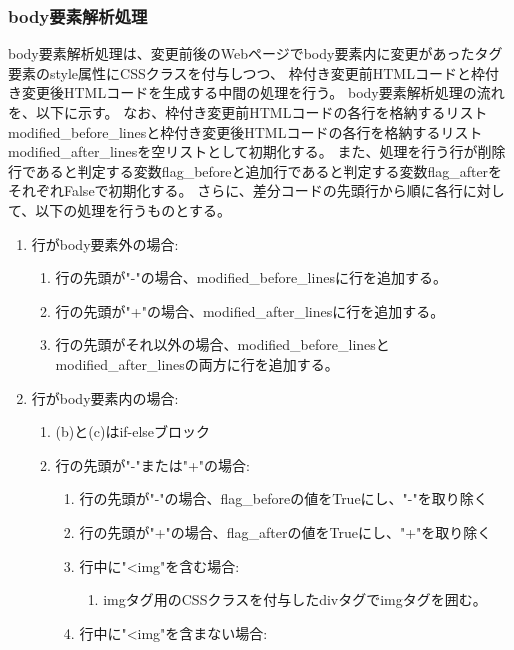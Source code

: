 \subsubsection{body要素解析処理}
body要素解析処理は、変更前後のWebページでbody要素内に変更があったタグ要素のstyle属性にCSSクラスを付与しつつ、
枠付き変更前HTMLコードと枠付き変更後HTMLコードを生成する中間の処理を行う。
body要素解析処理の流れを、以下に示す。
なお、枠付き変更前HTMLコードの各行を格納するリストmodified\_before\_linesと枠付き変更後HTMLコードの各行を格納するリストmodified\_after\_linesを空リストとして初期化する。
また、処理を行う行が削除行であると判定する変数flag\_beforeと追加行であると判定する変数flag\_afterをそれぞれFalseで初期化する。
さらに、差分コードの先頭行から順に各行に対して、以下の処理を行うものとする。
\begin{enumerate}
    \item 行がbody要素外の場合:
          \begin{enumerate}
              \item 行の先頭が"-"の場合、modified\_before\_linesに行を追加する。
              \item 行の先頭が"+"の場合、modified\_after\_linesに行を追加する。
              \item 行の先頭がそれ以外の場合、modified\_before\_linesとmodified\_after\_linesの両方に行を追加する。
          \end{enumerate}
    \item 行がbody要素内の場合:
          \begin{enumerate}
              \item (b)と(c)はif-elseブロック
              \item 行の先頭が"-"または"+"の場合:
                    \begin{enumerate}
                        \item 行の先頭が"-"の場合、flag\_beforeの値をTrueにし、"-"を取り除く
                        \item 行の先頭が"+"の場合、flag\_afterの値をTrueにし、"+"を取り除く
                        \item 行中に"\textless img"を含む場合:
                              \begin{enumerate}
                                  \item imgタグ用のCSSクラスを付与したdivタグでimgタグを囲む。
                              \end{enumerate}
                        \item 行中に"\textless img"を含まない場合:

\end{enumerate}
\end{enumerate}
\end{enumerate}
